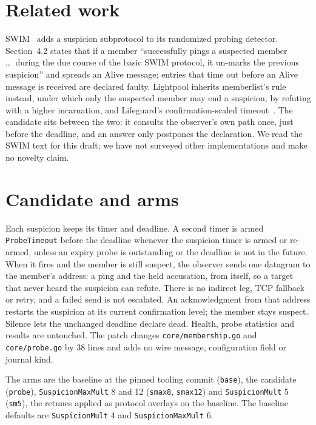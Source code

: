 \documentclass[10pt]{article}
\begin{document}
\section{Related work}
SWIM~\cite{swim} adds a suspicion subprotocol to its randomized probing
detector. Section~4.2 states that if a member ``successfully pings a
suspected member \ldots\ during the due course of the basic SWIM protocol,
it un-marks the previous suspicion'' and spreads an Alive message; entries
that time out before an Alive message is received are declared faulty.
Lightpool inherits memberlist's rule instead, under which only the
suspected member may end a suspicion, by refuting with a higher
incarnation, and Lifeguard's confirmation-scaled timeout~\cite{lifeguard}.
The candidate sits between the two: it consults the observer's own path
once, just before the deadline, and an answer only postpones the
declaration. We read the SWIM text for this draft; we have not surveyed
other implementations and make no novelty claim.

\section{Candidate and arms}
Each suspicion keeps its timer and deadline. A second timer is armed
\texttt{ProbeTimeout} before the deadline whenever the suspicion timer is
armed or re-armed, unless an expiry probe is outstanding or the deadline
is not in the future. When it fires and the member is still suspect, the
observer sends one datagram to the member's address: a ping and the held
accusation, from itself, so a target that never heard the suspicion can
refute. There is no indirect leg, TCP fallback or retry, and a failed send
is not escalated. An acknowledgment from that address restarts the
suspicion at its current confirmation level; the member stays suspect.
Silence lets the unchanged deadline declare dead. Health, probe statistics
and results are untouched. The patch changes \texttt{core/membership.go}
and \texttt{core/probe.go} by 38 lines and adds no wire message,
configuration field or journal kind.

The arms are the baseline at the pinned tooling commit (\texttt{base}),
the candidate (\texttt{probe}), \texttt{SuspicionMaxMult} 8 and 12
(\texttt{smax8}, \texttt{smax12}) and \texttt{SuspicionMult} 5
(\texttt{sm5}), the retunes applied as protocol overlays on the baseline.
The baseline defaults are \texttt{SuspicionMult} 4 and
\texttt{SuspicionMaxMult} 6.
\end{document}
